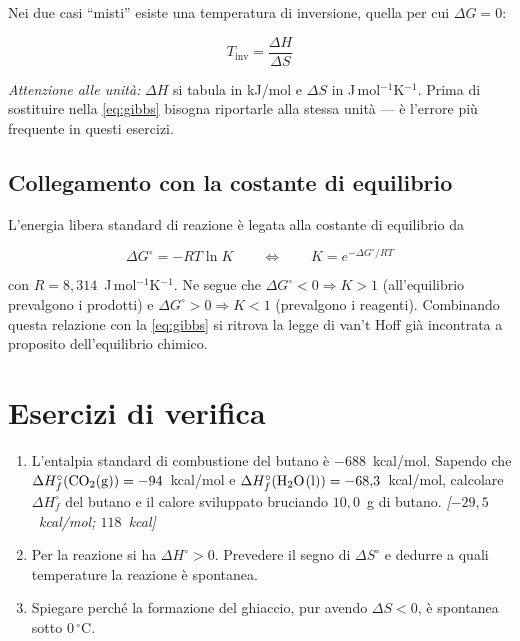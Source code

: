 \documentclass[11pt, a4paper, openright]{book}
\begin{document}
Nei due casi ``misti'' esiste una temperatura di inversione, quella per cui $\Delta G = 0$:

\begin{equation}
  T_{\text{inv}} = \frac{\Delta H}{\Delta S}
\end{equation}

\noindent\emph{Attenzione alle unità:} $\Delta H$ si tabula in kJ/mol e $\Delta S$ in
J\,mol$^{-1}$K$^{-1}$. Prima di sostituire nella \eqref{eq:gibbs} bisogna riportarle alla
stessa unità --- è l'errore più frequente in questi esercizi.

\subsection{Collegamento con la costante di equilibrio}

L'energia libera standard di reazione è legata alla costante di equilibrio da

\begin{equation}
  \Delta G^\circ = -RT \ln K
  \qquad\Longleftrightarrow\qquad
  K = e^{-\Delta G^\circ / RT}
\end{equation}

con $R = 8{,}314$~J\,mol$^{-1}$K$^{-1}$. Ne segue che $\Delta G^\circ < 0 \Rightarrow K > 1$
(all'equilibrio prevalgono i prodotti) e $\Delta G^\circ > 0 \Rightarrow K < 1$ (prevalgono
i reagenti). Combinando questa relazione con la \eqref{eq:gibbs} si ritrova la legge di
van't Hoff già incontrata a proposito dell'equilibrio chimico.


\section{Esercizi di verifica}

\begin{enumerate}
  \item L'entalpia standard di combustione del butano  è
        $-688$~kcal/mol. Sapendo che $\Delta H^\circ_f(\ce{CO2(g)}) = -94$~kcal/mol e
        $\Delta H^\circ_f(\ce{H2O(l)}) = -68{,}3$~kcal/mol, calcolare
        $\Delta H^\circ_f$ del butano e il calore sviluppato bruciando $10{,}0$~g di
        butano. \hfill \emph{[$-29{,}5$~kcal/mol; $118$~kcal]}
  \item Per la reazione  si ha $\Delta H^\circ > 0$.
        Prevedere il segno di $\Delta S^\circ$ e dedurre a quali temperature la reazione
        è spontanea.
  \item Spiegare perché la formazione del ghiaccio, pur avendo $\Delta S < 0$, è spontanea
        sotto $0\,^\circ$C.
\end{enumerate}
\end{document}

